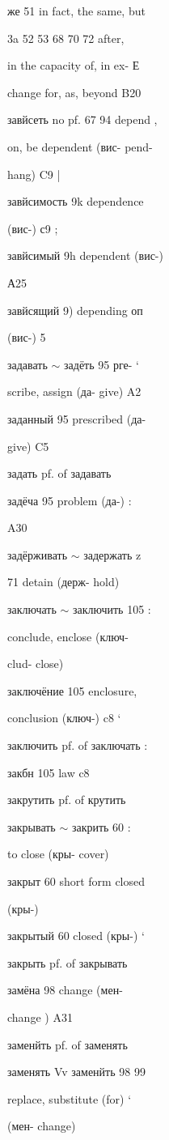 \begin{minipage}[t]{0.475\textwidth}
\raggedright
\noindent же 51 in fact, the same, but\par
\noindent 3a 52 53 68 70 72 after,\par
\noindent in the capacity of, in ex- Е\par
\noindent change for, as, beyond B20\par
\noindent завйсеть no pf. 67 94 depend ,\par
\noindent on, be dependent (вис- pend-\par
\noindent hang) C9 |\par
\noindent завйсимость 9k dependence\par
\noindent (вис-) с9 ;\par
\noindent завйсимый 9h dependent (вис-)\par
\noindent А25\par
\noindent завйсящий 9) depending оп\par
\noindent (вис-) 5\par
\noindent задавать $\sim$ задёть 95 рге- ‘\par
\noindent scribe, assign (да- give) A2\par
\noindent заданный 95 prescribed (да-\par
\noindent give) C5\par
\noindent задать pf. of задавать\par
\noindent задёча 95 problem (да-) :\par
\noindent A30\par
\noindent задёрживать $\sim$ задержать z\par
{} 71 detain (держ- hold)\par
\noindent заключать $\sim$ заключить 105 :\par
\noindent conclude, enclose (ключ-\par
\noindent clud- close)\par
\noindent заключёние 105 enclosure,\par
\noindent conclusion (ключ-) c8 ‘\par
\noindent заключить pf. of заключать :\par
\noindent закбн 105 law c8\par
\noindent закрутить pf. of крутить\par
\noindent закрывать $\sim$ закрить 60 :\par
\noindent to close (кры- cover)\par
\noindent закрыт 60 short form closed\par
\noindent (кры-)\par
\noindent закрытый 60 closed (кры-) ‘\par
\noindent закрыть pf. of закрывать\par
\noindent замёна 98 change (мен-\par
\noindent change ) A31\par
\noindent заменйть pf. of заменять\par
\noindent заменять Vv заменйть 98 99\par
\noindent replace, substitute (for) ‘\par
\noindent (мен- change)\par
\end{minipage}\hfill
